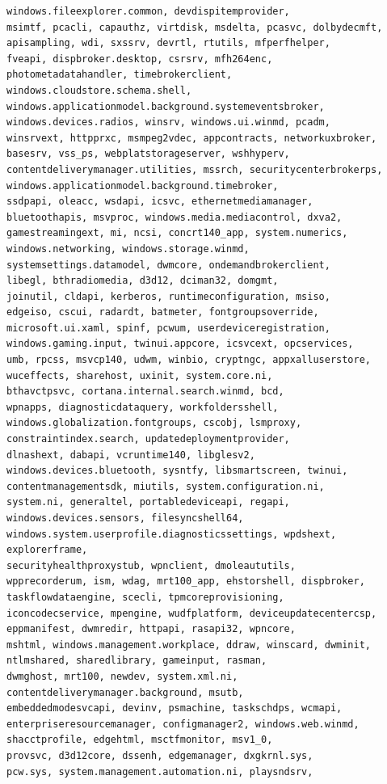 \documentclass[a4paper,twoside,12pt]{book}
\begin{document}
\begin{appendices}
\begin{lstlisting}[label={lst:dlls},caption={All gathered DLL's},escapeinside=``,basicstyle=\tiny,breaklines=true]
windows.fileexplorer.common, devdispitemprovider, 
msimtf, pcacli, capauthz, virtdisk, msdelta, pcasvc, dolbydecmft, 
apisampling, wdi, sxssrv, devrtl, rtutils, mfperfhelper, 
fveapi, dispbroker.desktop, csrsrv, mfh264enc, 
photometadatahandler, timebrokerclient, windows.cloudstore.schema.shell, 
windows.applicationmodel.background.systemeventsbroker, 
windows.devices.radios, winsrv, windows.ui.winmd, pcadm, 
winsrvext, httpprxc, msmpeg2vdec, appcontracts, networkuxbroker, 
basesrv, vss_ps, webplatstorageserver, wshhyperv, 
contentdeliverymanager.utilities, mssrch, securitycenterbrokerps, 
windows.applicationmodel.background.timebroker, 
ssdpapi, oleacc, wsdapi, icsvc, ethernetmediamanager, 
bluetoothapis, msvproc, windows.media.mediacontrol, dxva2, 
gamestreamingext, mi, ncsi, concrt140_app, system.numerics, 
windows.networking, windows.storage.winmd, 
systemsettings.datamodel, dwmcore, ondemandbrokerclient, 
libegl, bthradiomedia, d3d12, dciman32, domgmt, 
joinutil, cldapi, kerberos, runtimeconfiguration, msiso, 
edgeiso, cscui, radardt, batmeter, fontgroupsoverride, 
microsoft.ui.xaml, spinf, pcwum, userdeviceregistration, 
windows.gaming.input, twinui.appcore, icsvcext, opcservices, 
umb, rpcss, msvcp140, udwm, winbio, cryptngc, appxalluserstore, 
wuceffects, sharehost, uxinit, system.core.ni, 
bthavctpsvc, cortana.internal.search.winmd, bcd, 
wpnapps, diagnosticdataquery, workfoldersshell, 
windows.globalization.fontgroups, cscobj, lsmproxy, 
constraintindex.search, updatedeploymentprovider, 
dlnashext, dabapi, vcruntime140, libglesv2, 
windows.devices.bluetooth, sysntfy, libsmartscreen, twinui, 
contentmanagementsdk, miutils, system.configuration.ni, 
system.ni, generaltel, portabledeviceapi, regapi, 
windows.devices.sensors, filesyncshell64, 
windows.system.userprofile.diagnosticssettings, wpdshext, explorerframe, 
securityhealthproxystub, wpnclient, dmoleaututils, 
wpprecorderum, ism, wdag, mrt100_app, ehstorshell, dispbroker, 
taskflowdataengine, scecli, tpmcoreprovisioning, 
iconcodecservice, mpengine, wudfplatform, deviceupdatecentercsp, 
eppmanifest, dwmredir, httpapi, rasapi32, wpncore, 
mshtml, windows.management.workplace, ddraw, winscard, dwminit, 
ntlmshared, sharedlibrary, gameinput, rasman, 
dwmghost, mrt100, newdev, system.xml.ni, 
contentdeliverymanager.background, msutb, 
embeddedmodesvcapi, devinv, psmachine, taskschdps, wcmapi, 
enterpriseresourcemanager, configmanager2, windows.web.winmd, 
shacctprofile, edgehtml, msctfmonitor, msv1_0, 
provsvc, d3d12core, dssenh, edgemanager, dxgkrnl.sys, 
pcw.sys, system.management.automation.ni, playsndsrv, 

\end{lstlisting}
\end{appendices}
\end{document}
